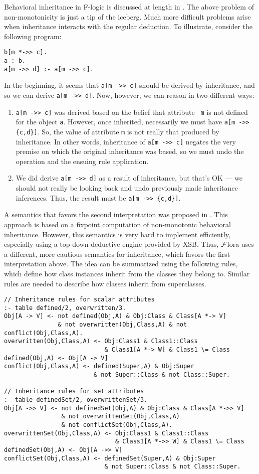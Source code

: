\documentclass[11pt]{article}
\newcommand{\FLORA}{{\mbox{${\cal F}${\sc lora}}}\xspace}
\begin{document}
Behavioral inheritance in F-logic is discussed at length in \cite{KLW95}.
The above problem of non-monotonicity is just a tip of the iceberg. Much
more difficult problems arise when inheritance interacts with the regular
deduction. To illustrate, consider the following program:
\begin{verbatim}
b[m *->> c].
a : b.
a[m ->> d] :- a[m ->> c].
\end{verbatim}
In the beginning, it seems that \verb|a[m ->> c]| should be derived by
inheritance, and so we can derive \verb|a[m ->> d]|. Now, however, we can
reason in two different ways:
\begin{enumerate}
\item \verb|a[m ->> c]| was derived based on the belief that attribute {\tt
    m} is not defined for the object {\tt a}. However, once inherited,
  necessarily we must have \verb|a[m ->> {c,d}]|. So, the value of
  attribute {\tt m} is not really that produced by inheritance. In other
  words, inheritance of \verb|a[m ->> c]| negates the very premise on which
  the original inheritance was based, so we must undo the operation and the
  ensuing rule application.
\item We did derive \verb|a[m ->> d]| as a result of inheritance, but
  that's OK --- we should not really be looking back and undo previously
  made inheritance inferences. Thus, the result must be \verb|a[m ->> {c,d}]|.
\end{enumerate}
A semantics that favors the second interpretation was proposed in
\cite{KLW95}. This approach is based on a fixpoint computation of
non-monotonic behavioral inheritance.  However, this semantics is very hard
to implement efficiently, especially using a top-down deductive engine
provided by XSB. Thus, \FLORA uses a different, more cautious semantics for
inheritance, which favors the first interpretation above.  The idea can be
summarized using the following rules, which define how class instances
inherit from the classes they belong to. Similar rules are needed to
describe how classes inherit from superclasses.
\begin{verbatim}
// Inheritance rules for scalar attributes
:- table defined/2, overwritten/3.
Obj[A -> V] <- not defined(Obj,A) & Obj:Class & Class[A *-> V]
               & not overwritten(Obj,Class,A) & not conflict(Obj,Class,A).
overwritten(Obj,Class,A) <- Obj:Class1 & Class1::Class 
                            & Class1[A *-> W] & Class1 \= Class
defined(Obj,A) <- Obj[A -> V]
conflict(Obj,Class,A) <- defined(Super,A) & Obj:Super
                         & not Super::Class & not Class::Super.

// Inheritance rules for set attributes
:- table definedSet/2, overwrittenSet/3.
Obj[A ->> V] <- not definedSet(Obj,A) & Obj:Class & Class[A *->> V]
                & not overwrittenSet(Obj,Class,A)
                & not conflictSet(Obj,Class,A).
overwrittenSet(Obj,Class,A) <- Obj:Class1 & Class1::Class
                               & Class1[A *->> W] & Class1 \= Class
definedSet(Obj,A) <- Obj[A ->> V]
conflictSet(Obj,Class,A) <- definedSet(Super,A) & Obj:Super
                            & not Super::Class & not Class::Super.
\end{verbatim}
\end{document}
